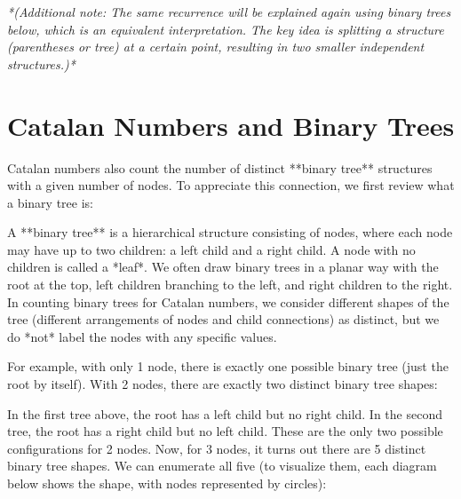 \documentclass{article}
\begin{document}
\textit{*(Additional note: The same recurrence will be explained again using binary trees below, which is an equivalent interpretation. The key idea is splitting a structure (parentheses or tree) at a certain point, resulting in two smaller independent structures.)*}

\section{Catalan Numbers and Binary Trees}

Catalan numbers also count the number of distinct **binary tree** structures with a given number of nodes. To appreciate this connection, we first review what a binary tree is:

A **binary tree** is a hierarchical structure consisting of nodes, where each node may have up to two children: a left child and a right child. A node with no children is called a *leaf*. We often draw binary trees in a planar way with the root at the top, left children branching to the left, and right children to the right. In counting binary trees for Catalan numbers, we consider different shapes of the tree (different arrangements of nodes and child connections) as distinct, but we do *not* label the nodes with any specific values.

For example, with only 1 node, there is exactly one possible binary tree (just the root by itself). With 2 nodes, there are exactly two distinct binary tree shapes:

\begin{center}
\hspace{1cm}
\end{center}

In the first tree above, the root has a left child but no right child. In the second tree, the root has a right child but no left child. These are the only two possible configurations for 2 nodes. Now, for 3 nodes, it turns out there are 5 distinct binary tree shapes. We can enumerate all five (to visualize them, each diagram below shows the shape, with nodes represented by circles):
\end{document}
